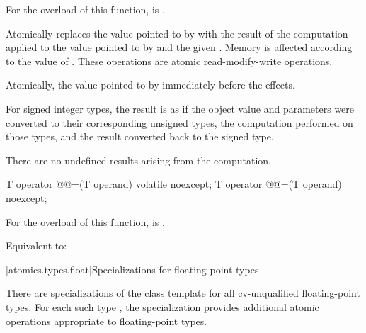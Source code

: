 \begin{itemdescr}
\pnum
\constraints
For the  overload of this function,
 is .

\pnum
\effects
Atomically replaces the value pointed to by
 with the result of the computation applied to the
value pointed to by  and the given .
Memory is affected according to the value of .
These operations are atomic read-modify-write operations.

\pnum
\returns
Atomically, the value pointed to by  immediately before the effects.

\pnum
{}%
\remarks
For signed integer types,
the result is as if the object value and parameters
were converted to their corresponding unsigned types,
the computation performed on those types, and
the result converted back to the signed type.
\begin{note}
There are no undefined results arising from the computation.
\end{note}

\end{itemdescr}

%
%
%
%
%
%
%
\begin{itemdecl}
T operator @@=(T operand) volatile noexcept;
T operator @@=(T operand) noexcept;
\end{itemdecl}

\begin{itemdescr}
\pnum
\constraints
For the  overload of this function,
 is .

\pnum
\effects
Equivalent to: 
\end{itemdescr}

[atomics.types.float]{Specializations for floating-point types}

%
\pnum
There are specializations of the 
class template for all cv-unqualified floating-point types.
For each such type ,
the specialization 
provides additional atomic operations appropriate to floating-point types.

